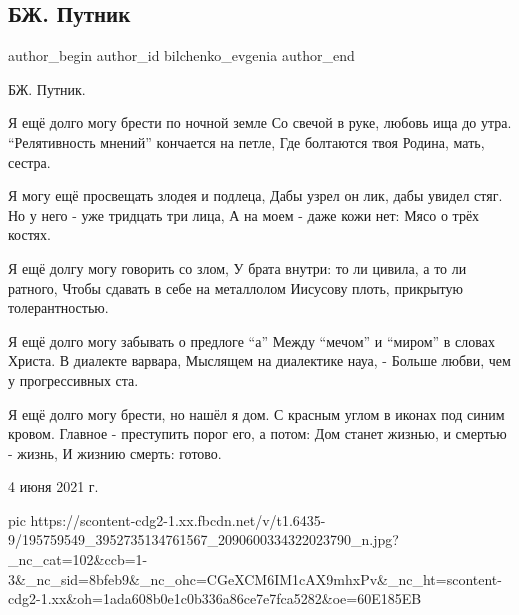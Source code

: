  
 
 
 
 
 
\subsection{БЖ. Путник}
\label{sec:04_06_2021.fb.bilchenko_evgenia.3.putnik}
\ifcmt
 author_begin
   author_id bilchenko_evgenia
 author_end
\fi

БЖ. Путник.

Я ещё долго могу брести по ночной земле
Со свечой в руке, любовь ища до утра.
\enquote{Релятивность мнений} кончается на петле,
Где болтаются твоя Родина, мать, сестра.

Я могу ещё просвещать злодея и подлеца,
Дабы узрел он лик, дабы увидел стяг.
Но у него - уже тридцать три лица,
А на моем - даже кожи нет: 
Мясо о трёх костях.

Я ещё долгу могу говорить со злом,
У брата внутри: то ли цивила, а то ли ратного,
Чтобы сдавать в себе на металлолом
Иисусову плоть, прикрытую толерантностью.

Я ещё долго могу забывать о предлоге \enquote{а}
Между \enquote{мечом} и \enquote{миром} в словах Христа.
В диалекте варвара, 
Мыслящем на диалектике науа, -
Больше любви, чем у прогрессивных ста.

Я ещё долго могу брести, но нашёл я дом.
С красным углом в иконах под синим кровом.
Главное - преступить порог его, а потом:
Дом станет жизнью, и смертью - жизнь, 
И жизнию смерть: готово.

4 июня 2021 г.

\ifcmt
  pic https://scontent-cdg2-1.xx.fbcdn.net/v/t1.6435-9/195759549_3952735134761567_2090600334322023790_n.jpg?_nc_cat=102&ccb=1-3&_nc_sid=8bfeb9&_nc_ohc=CGeXCM6IM1cAX9mhxPv&_nc_ht=scontent-cdg2-1.xx&oh=1ada608b0e1c0b336a86ce7e7fca5282&oe=60E185EB
\fi



